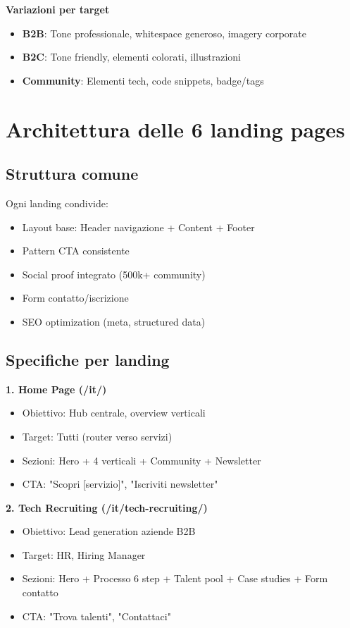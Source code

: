 \textbf{Variazioni per target}
\begin{itemize}
  \item \textbf{B2B}: Tone professionale, whitespace generoso, imagery corporate
  \item \textbf{B2C}: Tone friendly, elementi colorati, illustrazioni
  \item \textbf{Community}: Elementi tech, code snippets, badge/tags
\end{itemize}

\section{Architettura delle 6 landing pages}
\subsection{Struttura comune}
Ogni landing condivide:
\begin{itemize}
  \item Layout base: Header navigazione + Content + Footer
  \item Pattern CTA consistente
  \item Social proof integrato (500k+ community)
  \item Form contatto/iscrizione
  \item SEO optimization (meta, structured data)
\end{itemize}

\subsection{Specifiche per landing}
\textbf{1. Home Page (/it/)}
\begin{itemize}
  \item Obiettivo: Hub centrale, overview verticali
  \item Target: Tutti (router verso servizi)
  \item Sezioni: Hero + 4 verticali + Community + Newsletter
  \item CTA: "Scopri [servizio]", "Iscriviti newsletter"
\end{itemize}

\textbf{2. Tech Recruiting (/it/tech-recruiting/)}
\begin{itemize}
  \item Obiettivo: Lead generation aziende B2B
  \item Target: HR, Hiring Manager
  \item Sezioni: Hero + Processo 6 step + Talent pool + Case studies + Form contatto
  \item CTA: "Trova talenti", "Contattaci"
\end{itemize}

